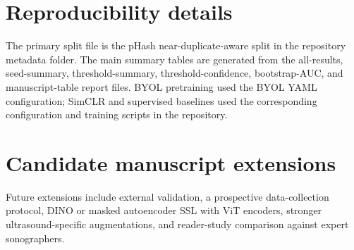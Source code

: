 \documentclass[pdflatex,sn-mathphys-num]{sn-jnl}
\theoremstyle{thmstyleone}
\theoremstyle{thmstyletwo}
\theoremstyle{thmstylethree}
\begin{document}
\begin{appendices}

\section{Reproducibility details}\label{app:reproducibility}

The primary split file is the pHash near-duplicate-aware split in the repository metadata folder. The main summary tables are generated from the all-results, seed-summary, threshold-summary, threshold-confidence, bootstrap-AUC, and manuscript-table report files. BYOL pretraining used the BYOL YAML configuration; SimCLR and supervised baselines used the corresponding configuration and training scripts in the repository.

\section{Candidate manuscript extensions}\label{app:extensions}

Future extensions include external validation, a prospective data-collection protocol, DINO or masked autoencoder SSL with ViT encoders, stronger ultrasound-specific augmentations, and reader-study comparison against expert sonographers.

\end{appendices}


\end{document}
